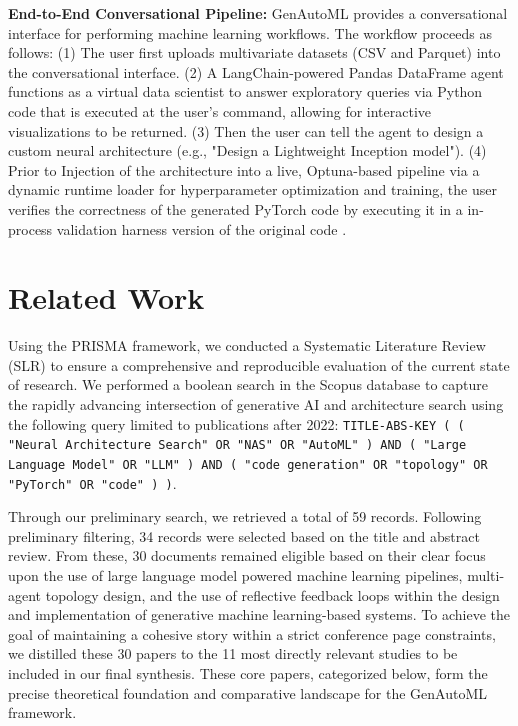 \documentclass{article}
\begin{document}
\textbf{End-to-End Conversational Pipeline:} GenAutoML provides a conversational interface for performing machine learning workflows. The workflow proceeds as follows: (1) The user first uploads multivariate datasets (CSV and Parquet) into the conversational interface. (2) A LangChain-powered Pandas DataFrame agent functions as a virtual data scientist to answer exploratory queries via Python code that is executed at the user’s command, allowing for interactive visualizations to be returned. (3) Then the user can tell the agent to design a custom neural architecture (e.g., "Design a Lightweight Inception model"). (4) Prior to Injection of the architecture into a live, Optuna-based pipeline via a dynamic runtime loader for hyperparameter optimization and training, the user verifies the correctness of the generated PyTorch code by executing it in a in-process validation harness version of the original code \cite{akiba2019optuna}.

\section{Related Work}
\label{sec:related_work}

Using the PRISMA framework, we conducted a Systematic Literature Review (SLR) to ensure a comprehensive and reproducible evaluation of the current  state of research. We performed a boolean search in the Scopus database to capture the rapidly advancing intersection of generative AI and architecture search using the following query limited to publications after 2022: \texttt{TITLE-ABS-KEY ( ( "Neural Architecture Search" OR "NAS" OR "AutoML" ) AND ( "Large Language Model" OR "LLM" ) AND ( "code generation" OR "topology" OR "PyTorch" OR "code" ) )}. 

 Through our preliminary search, we retrieved a total of 59 records. Following preliminary filtering, 34 records were selected based on the title and abstract review. From these, 30 documents remained eligible based on their clear focus upon the use of large language model powered machine learning pipelines, multi-agent topology design, and the use of reflective feedback loops within the design and implementation of generative machine learning-based systems. To achieve the goal of maintaining a cohesive story within a strict conference page constraints, we distilled these 30 papers to the 11 most directly relevant studies to be included in our final synthesis. These core papers, categorized below, form the precise theoretical foundation and comparative landscape for the GenAutoML framework.
\end{document}
